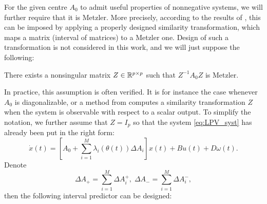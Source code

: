 For the given centre $A_0$ to admit useful properties of nonnegative systems, we will further require that it is Metzler. More precisely, according to the results of , this can be imposed by applying a properly designed similarity transformation, which maps a matrix (interval of matrices) to a Metzler one. Design of such a transformation is not considered in this work, and we will just suppose the following:
\begin{assumption}
	\begin{leftbar}[assumptionbar]
	\label{assumpt:metzler}
	There exists a nonsingular matrix $Z\in\mathbb{R}^{p\times p}$ such that $Z^{-1}A_{0}Z$ is Metzler.
	\end{leftbar}
\end{assumption}
In practice, this assumption is often verified. It is for instance the case whenever $A_{0}$ is diagonalizable, or a method from \cite{Efimov2013} computes a similarity transformation $Z$ when the system is observable with respect to a scalar output. To simplify the notation, we further assume that $Z=I_{p}$ so that the system \eqref{eq:LPV_syst} has already been put in the right form:
\[
\dot{x}(t)=[A_{0}+\sum_{i=1}^{M}\lambda_{i}(\theta(t))\Delta A_{i}]x(t)+Bu(t) + D\omega(t).
\]
Denote
\[
\Delta A_{+}=\sum_{i=1}^{M}\Delta A_{i}^{+},\;\Delta A_{-}=\sum_{i=1}^{M}\Delta A_{i}^{-},
\]
then the following interval predictor can be designed:
